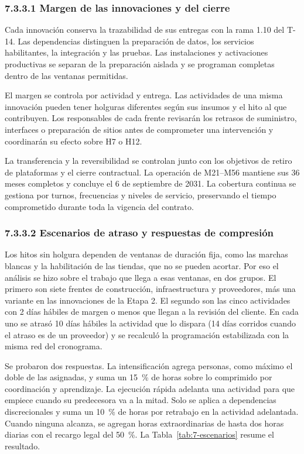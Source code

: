 \documentclass[11pt]{article}
\begin{document}
\subsubsection{7.3.3.1 Margen de las innovaciones y del cierre}

Cada innovación conserva la trazabilidad de sus entregas con la rama 1.10 del T-14. Las dependencias distinguen la preparación de datos, los servicios habilitantes, la integración y las pruebas. Las instalaciones y activaciones productivas se separan de la preparación aislada y se programan completas dentro de las ventanas permitidas.

El margen se controla por actividad y entrega. Las actividades de una misma innovación pueden tener holguras diferentes según sus insumos y el hito al que contribuyen. Los responsables de cada frente revisarán los retrasos de suministro, interfaces o preparación de sitios antes de comprometer una intervención y coordinarán su efecto sobre H7 o H12.

La transferencia y la reversibilidad se controlan junto con los objetivos de retiro de plataformas y el cierre contractual. La operación de M21--M56 mantiene sus 36 meses completos y concluye el 6 de septiembre de 2031. La cobertura continua se gestiona por turnos, frecuencias y niveles de servicio, preservando el tiempo comprometido durante toda la vigencia del contrato.

\subsubsection{7.3.3.2 Escenarios de atraso y respuestas de compresión}\label{sec:7-3-3-2}

Los hitos sin holgura dependen de ventanas de duración fija, como las marchas blancas y la habilitación de las tiendas, que no se pueden acortar. Por eso el análisis se hizo sobre el trabajo que llega a esas ventanas, en dos grupos. El primero son siete frentes de construcción, infraestructura y proveedores, más una variante en las innovaciones de la Etapa 2. El segundo son las cinco actividades con 2 días hábiles de margen o menos que llegan a la revisión del cliente. En cada uno se atrasó 10 días hábiles la actividad que lo dispara (14 días corridos cuando el atraso es de un proveedor) y se recalculó la programación estabilizada con la misma red del cronograma.

Se probaron dos respuestas. La intensificación agrega personas, como máximo el doble de las asignadas, y suma un 15~\% de horas sobre lo comprimido por coordinación y aprendizaje. La ejecución rápida adelanta una actividad para que empiece cuando su predecesora va a la mitad. Solo se aplica a dependencias discrecionales y suma un 10~\% de horas por retrabajo en la actividad adelantada. Cuando ninguna alcanza, se agregan horas extraordinarias de hasta dos horas diarias con el recargo legal del 50~\%. La Tabla~\ref{tab:7-escenarios} resume el resultado.
\end{document}
